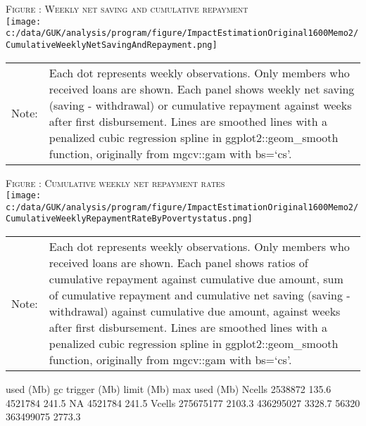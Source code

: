 \hfil\textsc{\footnotesize Figure \thefigure: Weekly net saving and cumulative repayment\label{fig weeklysavingrepay}}\\
\hfil\texttt{[image: c:/data/GUK/analysis/program/figure/ImpactEstimationOriginal1600Memo2/CumulativeWeeklyNetSavingAndRepayment.png]}\\
\renewcommand{\arraystretch}{1}
\hfil\begin{tabular}{>{\hfill\scriptsize}p{1cm}<{}>{\scriptsize}p{12cm}<{\hfill}}
Note:& Each dot represents weekly observations. Only members who received loans are shown. Each panel shows weekly net saving (saving - withdrawal) or cumulative repayment against weeks after first disbursement. Lines are smoothed lines with a penalized cubic regression spline in \textsf{ggplot2::geom\_smooth} function, originally from \textsf{mgcv::gam} with \textsf{bs=`cs'}. \\[-1ex]
\end{tabular}


\hfil\textsc{\footnotesize Figure \thefigure: Cumulative weekly net repayment rates\label{fig weeklysavingrepayrate}}\\
\hfil\texttt{[image: c:/data/GUK/analysis/program/figure/ImpactEstimationOriginal1600Memo2/CumulativeWeeklyRepaymentRateByPovertystatus.png]}\\
\renewcommand{\arraystretch}{1}
\hfil\begin{tabular}{>{\hfill\scriptsize}p{1cm}<{}>{\scriptsize}p{12cm}<{\hfill}}
Note:& Each dot represents weekly observations. Only members who received loans are shown. Each panel shows ratios of cumulative repayment against cumulative due amount, sum of cumulative repayment and cumulative net saving (saving - withdrawal) against cumulative due amount, against weeks after first disbursement. Lines are smoothed lines with a penalized cubic regression spline in \textsf{ggplot2::geom\_smooth} function, originally from \textsf{mgcv::gam} with \textsf{bs=`cs'}. \\[-1ex]
\end{tabular}





\begin{Schunk}
\begin{Soutput}
            used   (Mb) gc trigger   (Mb) limit (Mb)  max used   (Mb)
Ncells   2538872  135.6    4521784  241.5         NA   4521784  241.5
Vcells 275675177 2103.3  436295027 3328.7      56320 363499075 2773.3
\end{Soutput}
\end{Schunk}


